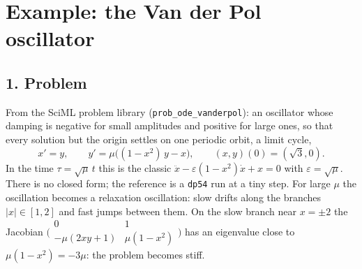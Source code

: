 \documentclass[11pt,a4paper]{article}
\begin{document}
\section*{Example: the Van der Pol oscillator}

\subsection*{1. Problem}
From the SciML problem library (\texttt{prob\_ode\_vanderpol}): an
oscillator whose damping is negative for small amplitudes and positive for
large ones, so that every solution but the origin settles on one periodic
orbit, a limit cycle,
\begin{equation*}
  x' = y, \qquad y' = \mu\bigl((1 - x^2)\,y - x\bigr), \qquad (x, y)(0) = (\sqrt 3, 0).
\end{equation*}
In the time $\tau = \sqrt\mu\, t$ this is the classic
$\ddot x - \varepsilon (1 - x^2)\dot x + x = 0$ with $\varepsilon = \sqrt\mu$.
There is no closed form; the reference is a \texttt{dp54} run at a tiny
step. For large $\mu$ the oscillation becomes a relaxation oscillation: slow
drifts along the branches $|x| \in [1, 2]$ and fast jumps between them. On
the slow branch near $x = \pm 2$ the Jacobian
$\bigl(\begin{smallmatrix} 0 & 1 \\ -\mu(2xy + 1) & \mu(1 - x^2)\end{smallmatrix}\bigr)$
has an eigenvalue close to $\mu(1 - x^2) = -3\mu$: the problem becomes stiff.
\begin{center}
\small

\end{center}

\newpage
\end{document}
